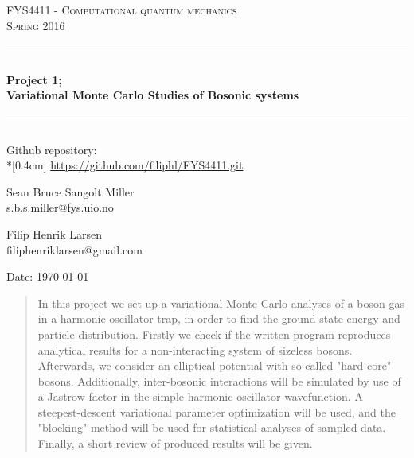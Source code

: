 \documentclass[english, a4paper]{article}
\begin{document}
\renewcommand{\figurename}{Figure}
\begin{titlepage}
\begin{center}

\textsc{\Large FYS4411 - Computational quantum mechanics }\\[0.5cm]
\textsc{\Large Spring 2016}\\[1.5cm]
\rule{\linewidth}{0.5mm} \\[0.4cm]
{ \huge \bfseries  Project 1;\\ Variational Monte Carlo Studies of Bosonic systems}\\[0.10cm]
\rule{\linewidth}{0.5mm} \\[1.5cm]

{\Large Github repository:} \\*[0.4cm]
\url{https://github.com/filiphl/FYS4411.git}

\vspace{13.5cm}

\begin{minipage}{\textwidth}
\begin{minipage}{0.49\textwidth}
    \begin{center} \large
        Sean Bruce Sangolt Miller\\
        {\footnotesize s.b.s.miller@fys.uio.no}
    \end{center}
\end{minipage}
\quad
\begin{minipage}{0.49\textwidth}
    \begin{center} \large
        Filip Henrik Larsen\\
        {\footnotesize filiphenriklarsen@gmail.com}
    \end{center}
\end{minipage}
\end{minipage}
\vfill

\large{Date: \today}

\end{center}
\end{titlepage}

\begin{abstract}
	In this project we set up a variational Monte Carlo analyses of a boson gas in a harmonic oscillator trap, in order to find the ground state energy and particle distribution. Firstly we check if the written program reproduces analytical results for a non-interacting system of sizeless bosons. Afterwards, we consider an elliptical potential with so-called "hard-core" bosons. Additionally, inter-bosonic interactions will be simulated by use of a Jastrow factor in the simple harmonic oscillator wavefunction. A steepest-descent variational parameter optimization will be used, and the "blocking" method will be used for statistical analyses of sampled data. Finally, a short review of produced results will be given.
\end{abstract}
\end{document}
